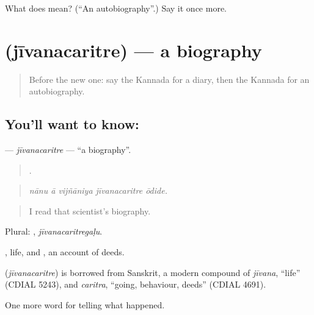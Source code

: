 \begin{tcolorbox}[breakable,colback=teal!4,colframe=teal!35!black,title={Before you move on}]
What does  mean? (\textquotedblleft{}An autobiography\textquotedblright{}.) Say it once more.
\end{tcolorbox}
\section[\texorpdfstring{\kn{ಜೀವನಚರಿತ್ರೆ} (jīvanacaritre)}{ಜೀವನಚರಿತ್ರೆ (jīvanacaritre)}]{ (jīvanacaritre) — a biography}

\label{lesson:KA-C364-jivanacaritre}



\begin{quote}
Before the new one: say the Kannada for a diary, then the Kannada for an autobiography.
\end{quote}

\subsection*{You'll want to know: }
\textbf{} — \emph{jīvanacaritre} — \textquotedblleft{}a biography\textquotedblright{}.

\begin{quote}
    .
\end{quote}

\begin{quote}
\emph{nānu ā vijñāniya jīvanacaritre ōdide.}
\end{quote}

\begin{quote}
I read that scientist's biography.
\end{quote}

Plural: , \emph{jīvanacaritregaḷu}.

, life, and , an account of deeds.

\begin{cousinweb}
\textbf{} (\emph{jīvanacaritre}) is borrowed from Sanskrit, a modern compound of \emph{jīvana}, \textquotedblleft{}life\textquotedblright{} (CDIAL 5243), and \emph{caritra}, \textquotedblleft{}going, behaviour, deeds\textquotedblright{} (CDIAL 4691).
\end{cousinweb}

\begin{grammarlens}[title={What you've built}]
One more word for telling what happened.
\end{grammarlens}


